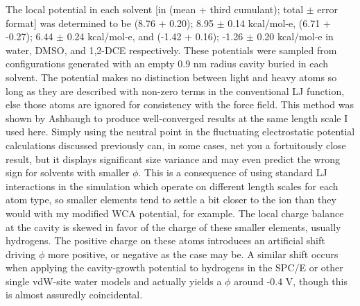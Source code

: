 \begin{tatb}
  The local potential in each solvent [in (mean + third cumulant); total $\pm$ error format] was determined to be (8.76 + 0.20); 8.95 $\pm$ 0.14 kcal/mol-e, 
  (6.71 + -0.27); 6.44 $\pm$ 0.24 kcal/mol-e, and (-1.42 + 0.16); -1.26 $\pm$ 0.20 kcal/mol-e in water, DMSO, and 1,2-DCE respectively. These potentials were sampled
  from configurations generated with an empty 0.9 nm radius cavity buried in each solvent. The potential makes no distinction between light and heavy atoms so long as
  they are described with non-zero terms in the conventional LJ function, else those atoms are ignored for consistency with the force field. This method was shown by
  Ashbaugh to produce well-converged results at the same length scale I used here\cite{ashbaugh2000size_sp}. Simply using the neutral point in the fluctuating 
  electrostatic potential calculations discussed previously can, in some cases, net you a fortuitously close result, but it displays significant size variance and may
  even predict the wrong sign for solvents with smaller $\phi$. This is a consequence of using standard LJ interactions in the simulation which operate on 
  different length scales for each atom type, so smaller elements tend to settle a bit closer to the ion than they would with my modified WCA potential, for example.
  The local charge balance at the cavity is skewed in favor of the charge of these smaller elements, usually hydrogens. The positive charge on these atoms introduces an 
  artificial shift driving $\phi$ more positive, or negative as the case may be. A similar shift occurs when applying the cavity-growth potential to hydrogens 
  in the SPC/E or other single vdW-site water models and actually yields a $\phi$ around -0.4 V, though this is almost assuredly coincidental\cite{beck2013sp}.


\end{tatb}
